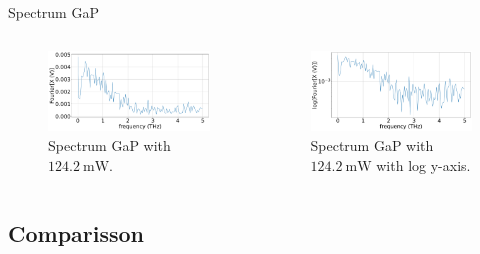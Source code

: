 \documentclass[aspectratio=1610, 9pt]{beamer}
\begin{document}
\begin{frame}{Spectrum GaP}
  \begin{columns}
    \begin{column}{.5\textwidth}
  \begin{figure}
    \includegraphics[width=\textwidth]{images/GaP14_55_42normalFX.pdf}
    \caption{Spectrum GaP with $\SI{124.2}{\milli\W}$.}
  \end{figure}
  \end{column}
  \begin{column}{.5\textwidth}
    \begin{figure}
      \includegraphics[width=\textwidth]{images/GaP14_55_42normallog(FX).pdf}
      \caption{Spectrum GaP with $\SI{124.2}{\milli\W}$ with log y-axis.}
    \end{figure}    
  \end{column}
  \end{columns}
\end{frame}

\subsection{Comparisson}
\end{document}
